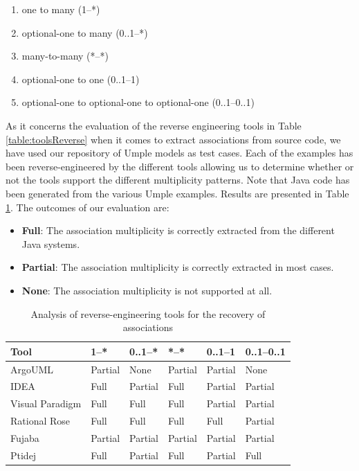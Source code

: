 \begin{enumerate}
\item one to many (1--*)
\item optional-one to many (0..1--*)
\item many-to-many (*--*)
\item optional-one to one (0..1--1)
\item optional-one to optional-one to optional-one (0..1--0..1)
\end{enumerate}

As it concerns the evaluation of the reverse engineering tools in Table \ref{table:toolsReverse} when it comes to extract associations from source code, we have used our repository of Umple models \cite{umpleexamples} as test cases.  Each of the examples has been reverse-engineered by the different tools allowing us to determine whether or not the tools support the different multiplicity patterns. Note that Java code has been generated from the various Umple examples. Results are presented in Table \ref{table:analyzeAssocsSecondPart}. The outcomes of our evaluation are:

\begin{itemize}
 \item \textbf{Full}: The association multiplicity is correctly extracted from the different Java systems.
 \item \textbf{Partial}: The association multiplicity is correctly extracted in most cases.
 \item \textbf{None}: The association multiplicity is not supported at all.
\end{itemize} 

\begin{table} [h]
\caption{Analysis of reverse-engineering tools for the recovery of associations}
\label{table:analyzeAssocsSecondPart}
\centering
\begin{tabular}{llllll}
\toprule
\rowcolor[HTML]{BBDAFF}
\textbf{Tool}   & \textbf{1--*}    & \textbf{0..1--*}   &  \textbf{*--*}   &  \textbf{0..1--1} & \textbf{0..1--0..1} \\ 
\hline
ArgoUML & Partial & None & Partial & Partial & None \\ 
IDEA & Full & Partial & Full & Partial & Partial \\ 
Visual Paradigm  & Full & Full & Full & Partial & Partial \\ 
Rational Rose & Full & Full & Full & Full & Partial \\ 
Fujaba  & Partial & Partial & Partial & Partial & Partial \\ 
Ptidej  & Full & Partial & Full & Partial & Full \\ 
\hline
\end{tabular}
\end{table}

